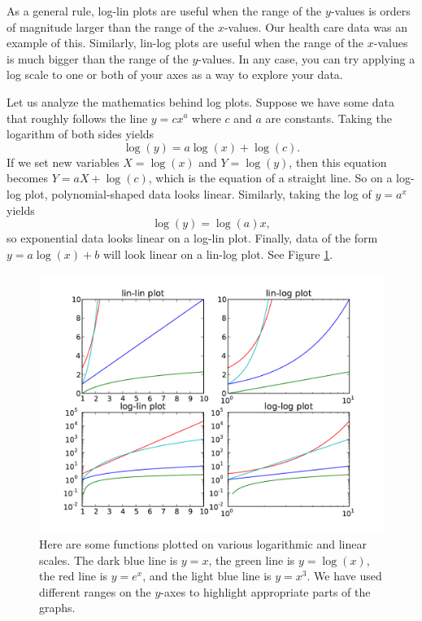 As a general rule, log-lin plots are useful when the range of the $y$-values is orders of magnitude larger than the range of the $x$-values. 
Our health care data was an example of this. 
Similarly, lin-log plots are useful when the range of the $x$-values is much bigger than the range of the $y$-values. 
In any case, you can try applying a log scale to one or both of your axes as a way to explore your data.

Let us analyze the mathematics behind log plots. 
Suppose we have some data that roughly follows the line $y=cx^a$ where $c$ and $a$ are constants. 
Taking the logarithm of both sides yields
\[
\log(y) = a\log(x) + \log(c).
\]
If we set new variables $X = \log(x)$ and $Y = \log(y)$, then this equation becomes $Y = aX + \log(c)$, which is the equation of a straight line. 
So  on a log-log plot, polynomial-shaped data looks linear. 
Similarly, taking the log of $y = a^x$ yields
\[
\log(y) = \log(a)x,
\]
so exponential data looks linear on a log-lin plot. 
Finally, data of the form $y = a\log(x)+b$ will look linear on a lin-log plot. 
See Figure \ref{fig:log_plots}.

\begin{figure}
\centering
\includegraphics[width=\textwidth]{log_plots.pdf}
\caption{Here are some functions plotted on various logarithmic and linear scales. 
The dark blue line is $y=x$, the green line is $y=\log(x)$, the red line is $y=e^x$, and the light blue line is $y=x^3$. 
We have used different ranges on the $y$-axes to highlight appropriate parts of the graphs.}
\label{fig:log_plots}
\end{figure}

